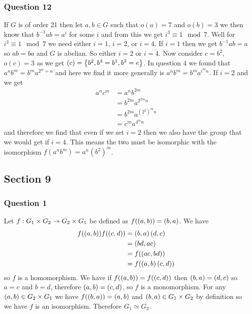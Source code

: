 \documentclass{article}
\begin{document}
\subsubsection{Question 12}

If $G$ is of order 21 then let $a,b \in G$ such that $o(a) = 7$ and $o(b) = 3$ we then know that $b^{-1}ab = a^{i}$ for some $i$ and from this we get $i^3 \equiv 1 \mod 7$. Well for $i^3 \equiv 1\mod 7$ we need either $i =1$, $i= 2$, or $i = 4$. If $i = 1$ then we get $b^{-1}ab = a$ so $ab = ba$ and $G$ is abelian. So either $i = 2$ or $i = 4$. Now consider $c = b^2$, $o(c) = 3$ as we get $(c) = \left\{ {b^2,b^4=b^1,b^3 = e} \right\}$. In question 4 we found that $a^nb^m=b^ma^{2^m+n}$ and here we find it more generally is $a^nb^m=b^ma^{i^mn}$. If $i = 2$ and we get
\begin{align*}
a^nc^m &= a^nb^{2m} \\
&= b^{2m}a^{2^{2m}n} \\
&= b^{2m}a^{\left(2^2\right)^mn}\\
&= c^ma^{4^mn}
\end{align*}
and therefore we find that even if we set $i = 2$ then we also have the group that we would get if $i=4$. This means the two must be isomorphic with the isomorphism $f(a^nb^m) = a^n\left(b^2\right)^m$.

\subsection{Section 9}
\subsubsection{Question 1}
Let $f:G_1\times G_2 \to G_2\times G_1$ be defined as $f(\left( {a} , {b} \right)) = \left( {b} , {a} \right)$. We have 
\begin{align*}
f(\left( {a} , {b} \right))f(\left( {c} , {d} \right)) &= \left( {b} , {a} \right)\left( {d} , {c} \right)\\
& = \left( {bd} , {ac} \right) \\
&= f(\left( {ac} , {bd} \right)) \\
&= f(\left( {a} , {b} \right)\left( {c} , {d} \right))
\end{align*}
so $f$ is a homomorphism. We have if $f(\left( {a} , {b} \right)) = f(\left( {c} , {d} \right))$ then $\left( {b} , {a} \right) = \left( {d} , {c} \right)$ so $a = c$ and $b = d$, therefore $\left( {a} , {b} \right)=\left( {c} , {d} \right)$, so $f$ is a monomorphism. For any $\left( {a} , {b} \right)\in G_2\times G_1$ we have $f(\left( {b} , {a} \right)) = \left( {a} , {b} \right)$ and $\left( {b} , {a} \right) \in G_1\times G_2$ by definition so we have $f$ is an isomorphism. Therefore $G_1\simeq G_2$.
\end{document}
